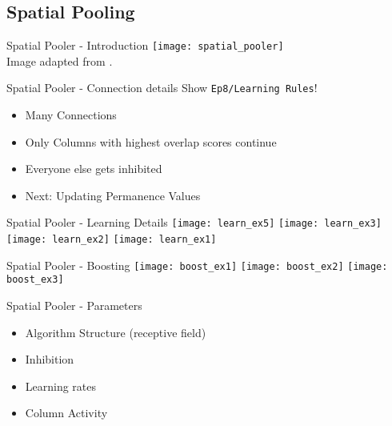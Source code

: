 \subsection{Spatial Pooling}


\begin{frame}[c]{Spatial Pooler - Introduction}
    \pause
    \texttt{[image: spatial\_pooler]} \\
    \normalsize
    Image adapted from \cite{cui2017htm}.
\end{frame}


\begin{frame}[c,fragile]{Spatial Pooler - Connection details}
    \Large
    Show \verb!Ep8/Learning Rules!!
    \newline
    \begin{itemize}[<+(1)->]
        \item Many Connections
        \item Only Columns with highest overlap scores continue
        \item Everyone else gets inhibited
        \item Next: Updating Permanence Values
    \end{itemize}
\end{frame}


\begin{frame}[c,allowframebreaks]{Spatial Pooler - Learning Details}
    \texttt{[image: learn\_ex5]}
    \texttt{[image: learn\_ex3]}
    \texttt{[image: learn\_ex2]}
    \texttt{[image: learn\_ex1]}
\end{frame}





\begin{frame}[c,allowframebreaks]{Spatial Pooler - Boosting}
    \texttt{[image: boost\_ex1]}
    \texttt{[image: boost\_ex2]}
    \texttt{[image: boost\_ex3]}
\end{frame}


\begin{frame}[c]{Spatial Pooler - Parameters}
    \Large
    \begin{itemize}[<+(1)->]
        \item Algorithm Structure (receptive field)
        \item Inhibition
        \item Learning rates
        \item Column Activity
    \end{itemize}
\end{frame}


